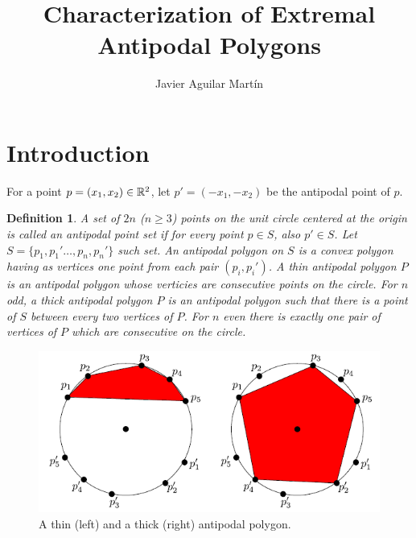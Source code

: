\documentclass[twoside]{article}
\newtheorem{defin}{Definition}[section]
\begin{document}
\title{Characterization of Extremal Antipodal Polygons}
\author{Javier Aguilar Martín}
\maketitle

\section{Introduction}

For a point $p=(x_1,x_2)\in\mathbb{R}^2$, let $p'=(-x_1,-x_2)$ be the antipodal point of $p$.

\begin{defin}
A set of $2n$ ($n\geq 3$) points on the unit circle centered at the origin is called an \emph{antipodal point set} if for every point $p\in S$, also $p'\in S$. Let $S=\{p_1,p_1'\dots,p_n,p_n'\}$ such set. An \emph{antipodal polygon} on $S$ is a convex polygon  having as vertices one point from each pair $(p_i,p_i')$. A \emph{thin} antipodal polygon $P$ is an antipodal polygon whose verticies are consecutive points on the circle. For $n$ odd, a \emph{thick} antipodal polygon $P$ is an antipodal polygon such that there is a point of $S$ between every two vertices of $P$. For $n$ even there is exactly one pair of vertices of $P$ which are consecutive on the circle. 
\end{defin}

\begin{figure}[h!]
\centering
\includegraphics[scale=0.7]{fig1}
\caption{A thin (left) and a thick (right) antipodal polygon.}
\end{figure}
\end{document}
